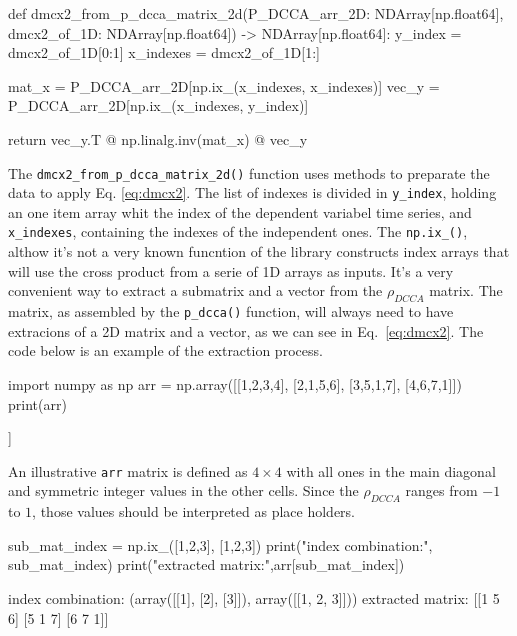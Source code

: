 \documentclass[article]{jss}
\begin{document}
\begin{Code}
def dmcx2_from_p_dcca_matrix_2d(P_DCCA_arr_2D: NDArray[np.float64], 
          dmcx2_of_1D: NDArray[np.float64]) -> NDArray[np.float64]:   
  y_index = dmcx2_of_1D[0:1]
  x_indexes = dmcx2_of_1D[1:]

  mat_x = P_DCCA_arr_2D[np.ix_(x_indexes, x_indexes)]
  vec_y = P_DCCA_arr_2D[np.ix_(x_indexes, y_index)]

  return vec_y.T @ np.linalg.inv(mat_x) @ vec_y
\end{Code}

The \verb"dmcx2_from_p_dcca_matrix_2d()" function uses  methods to preparate the data to apply Eq. \ref{eq:dmcx2}. The list of indexes is divided in \verb"y_index", holding an one item array whit the index of the dependent variabel time series, and \verb"x_indexes", containing the indexes of the independent ones. The  \verb"np.ix_()", althow it's not a very known funcntion of the library constructs index arrays that will use the cross product from a serie of 1D arrays as inputs. It's a very convenient way to extract a submatrix and a vector from the $\rho_{DCCA}$ matrix. The matrix, as assembled by the \verb"p_dcca()" function, will always need to have extracions of a 2D matrix and a vector, as we can see in Eq.~\ref{eq:dmcx2}. The code below is an example of the extraction process.

\begin{CodeChunk}
\begin{CodeInput}
import numpy as np
arr = np.array([[1,2,3,4],
                [2,1,5,6],
                [3,5,1,7],
                [4,6,7,1]])
print(arr)
\end{CodeInput}

\begin{CodeOutput}
[[1 2 3 4]
 [2 1 5 6]
 [3 5 1 7]
 [4 6 7 1]]
\end{CodeOutput}
\end{CodeChunk}
An illustrative \verb"arr" matrix is defined as $4 \times 4$ with all ones in the main diagonal and symmetric integer values in the other cells. Since the $\rho_{DCCA}$ ranges from $-1$ to $1$, those values should be interpreted as place holders. 
\begin{CodeChunk}
\begin{CodeInput}
sub_mat_index = np.ix_([1,2,3], [1,2,3])
print("index combination:\n", sub_mat_index)
print("extracted matrix:\n",arr[sub_mat_index])
\end{CodeInput}

\begin{CodeOutput}
index combination:
(array([[1],
      [2],
      [3]]), array([[1, 2, 3]]))
extracted matrix:
[[1 5 6]
[5 1 7]
[6 7 1]]
\end{CodeOutput}
\end{CodeChunk}
\end{document}
